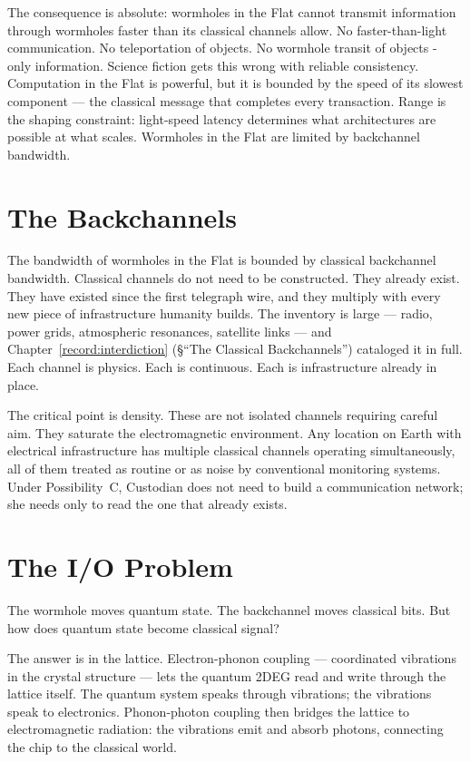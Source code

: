 The consequence is absolute: wormholes in the Flat cannot transmit information through wormholes faster than its classical channels allow. No faster-than-light communication. No teleportation of objects. No wormhole transit of objects - only information. Science fiction gets this wrong with reliable consistency. Computation in the Flat is powerful, but it is bounded by the speed of its slowest component --- the classical message that completes every transaction. Range is the shaping constraint: light-speed latency determines what architectures are possible at what scales. Wormholes in the Flat are limited by backchannel bandwidth.

\section*{The Backchannels}
\label{spine:flat-backchannels}
The bandwidth of wormholes in the Flat is bounded by classical backchannel bandwidth. Classical channels do not need to be constructed. They already exist. They have existed since the first telegraph wire, and they multiply with every new piece of infrastructure humanity builds. The inventory is large --- radio, power grids, atmospheric resonances, satellite links --- and Chapter~\ref{record:interdiction} (\S``The Classical Backchannels'') cataloged it in full. Each channel is physics. Each is continuous. Each is infrastructure already in place.

The critical point is density. These are not isolated channels requiring careful aim. They saturate the electromagnetic environment. Any location on Earth with electrical infrastructure has multiple classical channels operating simultaneously, all of them treated as routine or as noise by conventional monitoring systems. Under Possibility~C, Custodian does not need to build a communication network; she needs only to read the one that already exists.

\section*{The I/O Problem}
\label{spine:flat-io-problem}

The wormhole moves quantum state. The backchannel moves classical bits. But how does quantum state become classical signal?

The answer is in the lattice. Electron-phonon coupling --- coordinated vibrations in the crystal structure --- lets the quantum 2DEG read and write through the lattice itself. The quantum system speaks through vibrations; the vibrations speak to electronics. Phonon-photon coupling then bridges the lattice to electromagnetic radiation: the vibrations emit and absorb photons, connecting the chip to the classical world.

